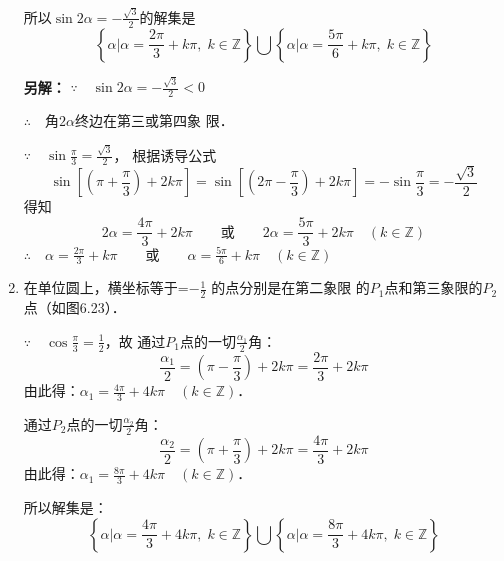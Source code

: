 \begin{solution}
\begin{enumerate}
所以$\sin2\alpha=-\frac{\sqrt{3}}{2}$的解集是
\[\left\{\alpha\Big|\alpha=\frac{2\pi}{3}+k\pi,\; k\in\mathbb{Z}\right\}\bigcup \left\{\alpha\Big|\alpha=\frac{5\pi}{6}+k\pi,\; k\in\mathbb{Z}\right\}\]

\textbf{另解：}
$\because\quad \sin2\alpha=-\frac{\sqrt{3}}{2}<0$

$\therefore\quad$角$ 2\alpha$终边在第三或第四象
限．

$\because\quad \sin\frac{\pi}{3}=\frac{\sqrt{3}}{2}$，
根据诱导公式
\[\sin\left[\left(\pi+\frac{\pi}{3}\right)+2k\pi\right]=\sin\left[\left(2\pi-\frac{\pi}{3}\right)+2k\pi\right]=-\sin\frac{\pi}{3}=-\frac{\sqrt{3}}{2}\]
得知
\[2\alpha=\frac{4\pi}{3}+2k\pi\qquad \text{或}\qquad 2\alpha=\frac{5\pi}{3}+2k\pi\quad (k\in\mathbb{Z})\]
$\therefore\quad \alpha=\frac{2\pi}{3}+k\pi\qquad \text{或}\qquad \alpha=\frac{5\pi}{6}+k\pi\quad (k\in\mathbb{Z})$

\item 在单位圆上，横坐标等于=$-\frac{1}{2}$
的点分别是在第二象限
的$P_1$点和第三象限的$P_2$点（如图6.23）．

\begin{figure}[htp]
    \centering
{}
    \caption{}
\end{figure}


$\because\quad \cos\frac{\pi}{3}=\frac{1}{2}$，故
通过$P_1$点的一切$\frac{\alpha_1}{2}$角：
\[\frac{\alpha_1}{2}=\left(\pi-\frac{\pi}{3}\right)+2k\pi=\frac{2\pi}{3}+2k\pi\]
由此得：$\alpha_1=\frac{4\pi}{3}+4k\pi\quad (k\in\mathbb{Z})$．

通过$P_2$点的一切$\frac{\alpha_2}{2}$角：
\[\frac{\alpha_2}{2}=\left(\pi+\frac{\pi}{3}\right)+2k\pi=\frac{4\pi}{3}+2k\pi\]
由此得：$\alpha_1=\frac{8\pi}{3}+4k\pi\quad (k\in\mathbb{Z})$．

所以解集是：
\[\left\{\alpha\Big|\alpha=\frac{4\pi}{3}+4k\pi,\; k\in\mathbb{Z}\right\}\bigcup \left\{\alpha\Big|\alpha=\frac{8\pi}{3}+4k\pi,\; k\in\mathbb{Z}\right\}\]


\end{enumerate}
\end{solution}
